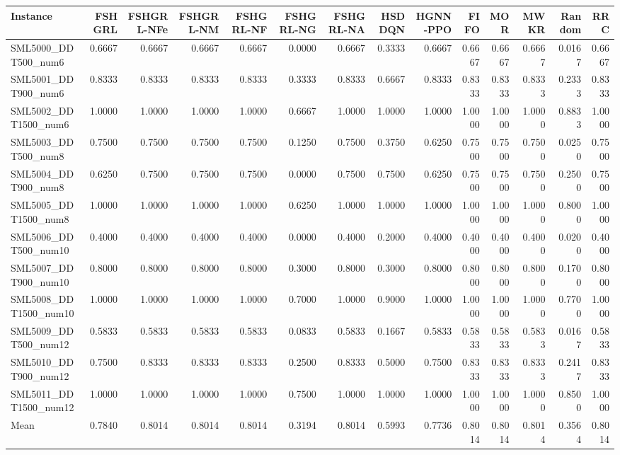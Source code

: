 \begin{tabular}{lrrrrrrrrrrrrr}
\toprule
Instance & FSHGRL & FSHGRL-NFe & FSHGRL-NM & FSHGRL-NF & FSHGRL-NG & FSHGRL-NA & HSDDQN & HGNN-PPO & FIFO & MOR & MWKR & Random & RRC \\
\midrule
SML5000\_DDT500\_num6 & 0.6667 & 0.6667 & 0.6667 & 0.6667 & 0.0000 & 0.6667 & 0.3333 & 0.6667 & 0.6667 & 0.6667 & 0.6667 & 0.0167 & 0.6667 \\
SML5001\_DDT900\_num6 & 0.8333 & 0.8333 & 0.8333 & 0.8333 & 0.3333 & 0.8333 & 0.6667 & 0.8333 & 0.8333 & 0.8333 & 0.8333 & 0.2333 & 0.8333 \\
SML5002\_DDT1500\_num6 & 1.0000 & 1.0000 & 1.0000 & 1.0000 & 0.6667 & 1.0000 & 1.0000 & 1.0000 & 1.0000 & 1.0000 & 1.0000 & 0.8833 & 1.0000 \\
SML5003\_DDT500\_num8 & 0.7500 & 0.7500 & 0.7500 & 0.7500 & 0.1250 & 0.7500 & 0.3750 & 0.6250 & 0.7500 & 0.7500 & 0.7500 & 0.0250 & 0.7500 \\
SML5004\_DDT900\_num8 & 0.6250 & 0.7500 & 0.7500 & 0.7500 & 0.0000 & 0.7500 & 0.7500 & 0.6250 & 0.7500 & 0.7500 & 0.7500 & 0.2500 & 0.7500 \\
SML5005\_DDT1500\_num8 & 1.0000 & 1.0000 & 1.0000 & 1.0000 & 0.6250 & 1.0000 & 1.0000 & 1.0000 & 1.0000 & 1.0000 & 1.0000 & 0.8000 & 1.0000 \\
SML5006\_DDT500\_num10 & 0.4000 & 0.4000 & 0.4000 & 0.4000 & 0.0000 & 0.4000 & 0.2000 & 0.4000 & 0.4000 & 0.4000 & 0.4000 & 0.0200 & 0.4000 \\
SML5007\_DDT900\_num10 & 0.8000 & 0.8000 & 0.8000 & 0.8000 & 0.3000 & 0.8000 & 0.3000 & 0.8000 & 0.8000 & 0.8000 & 0.8000 & 0.1700 & 0.8000 \\
SML5008\_DDT1500\_num10 & 1.0000 & 1.0000 & 1.0000 & 1.0000 & 0.7000 & 1.0000 & 0.9000 & 1.0000 & 1.0000 & 1.0000 & 1.0000 & 0.7700 & 1.0000 \\
SML5009\_DDT500\_num12 & 0.5833 & 0.5833 & 0.5833 & 0.5833 & 0.0833 & 0.5833 & 0.1667 & 0.5833 & 0.5833 & 0.5833 & 0.5833 & 0.0167 & 0.5833 \\
SML5010\_DDT900\_num12 & 0.7500 & 0.8333 & 0.8333 & 0.8333 & 0.2500 & 0.8333 & 0.5000 & 0.7500 & 0.8333 & 0.8333 & 0.8333 & 0.2417 & 0.8333 \\
SML5011\_DDT1500\_num12 & 1.0000 & 1.0000 & 1.0000 & 1.0000 & 0.7500 & 1.0000 & 1.0000 & 1.0000 & 1.0000 & 1.0000 & 1.0000 & 0.8500 & 1.0000 \\
Mean & 0.7840 & 0.8014 & 0.8014 & 0.8014 & 0.3194 & 0.8014 & 0.5993 & 0.7736 & 0.8014 & 0.8014 & 0.8014 & 0.3564 & 0.8014 \\
\bottomrule
\end{tabular}
